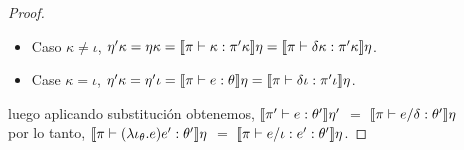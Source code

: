 \begin{proof}
\begin{itemize}
\item Caso $\kappa \neq \iota$, $\eta' \kappa = \eta \kappa = 
									\llbracket \pi \vdash \kappa : \pi'\kappa \rrbracket\eta = 
									\llbracket \pi \vdash \delta \kappa : \pi'\kappa \rrbracket\eta$.

\item Case $\kappa = \iota$, $\eta' \kappa = \eta' \iota = 
									 \llbracket \pi \vdash e : \theta \rrbracket\eta = 
									 \llbracket \pi \vdash \delta \iota : \pi'\iota \rrbracket\eta$.
\end{itemize}

luego aplicando substituci\'on obtenemos,
$\llbracket \pi' \vdash e : \theta' \rrbracket\eta'$ $=$ $\llbracket \pi \vdash e / \delta : \theta' \rrbracket\eta$\\

por lo tanto, $\llbracket \pi \vdash (\lambda \iota_{\theta} . e)e' : \theta' \rrbracket\eta$ $=$
 			  $\llbracket \pi \vdash e / \iota:e' : \theta' \rrbracket\eta$.

\end{proof}
